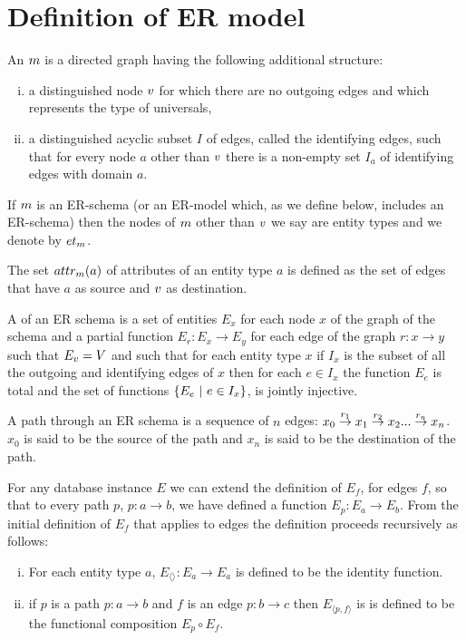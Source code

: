  \section{Definition of ER model}

\begin{definition}
An  ${m}$ is a directed graph having the following additional structure:

\begin{enumerate} [(i)]
\item{a distinguished node $v$ for which there are no outgoing edges and which represents the type of universals, }

\item{a distinguished acyclic subset $I$ of edges, called the identifying edges, such that
for every node $a$ other than $v$ there is a non-empty set $I_a$ of identifying edges with domain $a$. 
}
\end{enumerate}

\end{definition}

If ${m}$ is an ER-schema (or an ER-model which, as we define below, 
includes an ER-schema) then the nodes of ${m}$ other than $v$ we say are entity types and we denote by $et_{{m}}$.

The set $attr_{{m}}(a)$ of attributes of an entity type $a$ is defined as the set of edges that have $a$ as source and  $v$ as destination. 

\begin{definition}
\noindent A   of an ER schema is
a set of entities $E_x$ for each node $x$ of the graph of the schema and 
a partial function $E_r : E_x \rightarrow E_y$ for each edge of the graph $r:x \rightarrow y$ 
such that $E_v=V$
and such that 
for each entity type $x$ if $I_x$ is the subset of all the outgoing and identifying edges
of $x$ then for each $e \in I_x$ the function $E_e$ is total and
the set of functions $\left\{E_e \ \middle|\ e \in I_x\right\}$, is jointly injective.
\end{definition}

\noindent A  path through an ER schema  is a
sequence of  $n$ edges:
$\overset{r_1}{x_0 \rightarrow   x_1} \overset{r_2}{\rightarrow} x_2 ... \overset{r_n}{\rightarrow} x_n$.  $x_0$ is said to be the source of the path and $x_n$ is said to be the destination of the path. 

\noindent For any database instance $E$ we can  extend  the definition of
$E_f$, for edges $f$,  so that to every path $p$, $p: a \rightarrow b$,  we have defined a function $E_p: E_a \rightarrow E_b$. From the initial definition of $E_f$ that applies to 
edges the definition proceeds recursively as follows: 
\begin{enumerate} [(i)]
\item{  For each entity type $a$, $E_{\langle \rangle}: E_a \rightarrow E_a$ is defined to be the identity function.
}
\item{   if $p$ is a path $p: a \rightarrow b$ and $f$ is an edge $p: b \rightarrow c$ then $E_{\langle p,f \rangle}$ is 
is defined to be the functional composition $E_p \circ E_f$.
}
\end{enumerate}

